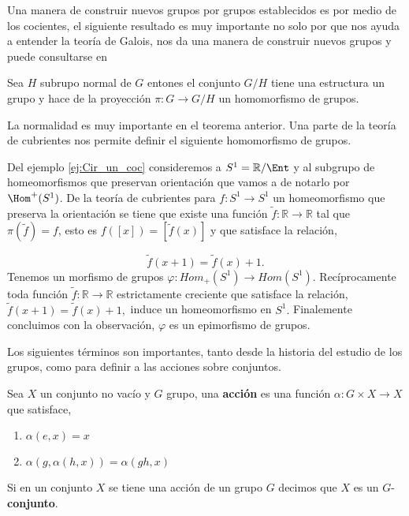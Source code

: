Una manera de construir nuevos grupos por grupos establecidos es por medio de los cocientes, el siguiente resultado es muy importante no solo por que nos ayuda a entender la teoría de Galois, nos da una manera de construir nuevos grupos y puede consultarse en \cite{alg_zald}
	
\begin{te}
Sea $H$ subrupo normal de  $G$ entones el conjunto $G/H$ tiene una estructura un grupo y hace de la proyección $\pi:G \to G/H$ un homomorfismo de grupos.
\end{te}
	
La normalidad es muy importante en el teorema anterior. Una parte de la teoría de cubrientes nos permite definir el siguiente homomorfismo de grupos.


\begin{ej}
Del ejemplo \ref{ej:Cir_un_coc} consideremos a $S^1=\mathbb{R} / \Ent$ y al subgrupo de homeomorfismos que preservan orientación que vamos a de notarlo por $\Hom^+(S^1)$. De la teoría de cubrientes para $f: S^1 \to S^1$ un homeomorfismo que preserva la orientación se tiene que existe una función $\tilde{f}:\mathbb{R} \to \mathbb{R}$ tal que $\pi(\tilde{f})=f$, esto es $f([x])=[\tilde{f}(x)]$ y que satisface la relación,

$$\tilde{f}(x+1)=\tilde{f}(x)+1.$$
Tenemos un morfismo de grupos $\varphi: Hom_+(S^1) \to Hom(S^1)$. 
Recíprocamente toda función  $\tilde{f}:\mathbb{R} \to \mathbb{R}$ estrictamente  creciente que satisface la relación, $\tilde{f}(x+1)=\tilde{f}(x)+1,$ induce un homeomorfismo en $S^1.$ Finalemente concluimos con la observación, $\varphi$ es un epimorfismo de grupos. 
\end{ej}
	
	Los siguientes términos son importantes, tanto desde la historia del estudio de los grupos, como para definir a las acciones sobre conjuntos.	
	

	\begin{df}
	Sea $X$ un conjunto no vacío y $G$ grupo, una \textbf{acción} es una función $\alpha:G \times X \to X$ que satisface,
	\begin{enumerate}
	\item $\alpha(e,x)=x$
	\item $\alpha(g,\alpha(h,x))=\alpha(gh,x)$
	\end{enumerate}
Si en un conjunto $X$ se tiene una acción de un grupo $G$ decimos que $X$ es un $G$-\textbf{conjunto}.
	\end{df}


